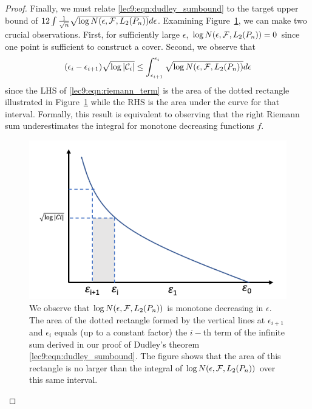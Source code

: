 \begin{proof}
    Finally, we must relate \eqref{lec9:eqn:dudley_sumbound} to the target upper bound of $12 \int \frac{1}{\sqrt{n}} \sqrt{\log N(\epsilon, \mathcal F, L_2(P_n))} d\epsilon$. Examining Figure~\ref{lec9:fig:chaining_riemann}, we can make two crucial observations. First, for sufficiently large $\epsilon$, $\log N(\epsilon, \mathcal F, L_2(P_n)) = 0$ since one point is sufficient to construct a cover. Second, we observe that 
    \begin{align}
        (\epsilon_i - \epsilon_{i + 1}) \sqrt{\log \left\lvert\mathcal C_i\right\rvert} \leq \int_{\epsilon_{i + 1}}^{\epsilon_i} \sqrt{\log N(\epsilon, \mathcal F, L_2(P_n))} d\epsilon \label{lec9:eqn:riemann_term}
    \end{align}
    since the LHS of \eqref{lec9:eqn:riemann_term} is the area of the dotted rectangle illustrated in Figure~\ref{lec9:fig:chaining_riemann} while the RHS is the area under the curve for that interval. Formally, this result is equivalent to observing that the right Riemann sum underestimates the integral for monotone decreasing functions $f$.

    \begin{figure}[ht!]
        \begin{center}
            \includegraphics[width=.7\textwidth]{figures/chaining_riemann.png}
        \end{center}
        \caption{We observe that $\log N(\epsilon, \mathcal F, L_2(P_n))$ is monotone decreasing in $\epsilon$. The area of the dotted rectangle formed by the vertical lines at $\epsilon_{i + 1}$ and $\epsilon_i$ equals (up to a constant factor) the $i-$th term of the infinite sum derived in our proof of Dudley's theorem \eqref{lec9:eqn:dudley_sumbound}. The figure shows that the area of this rectangle is no larger than the integral of $\log N(\epsilon, \mathcal F, L_2(P_n))$ over this same interval.}
        \label{lec9:fig:chaining_riemann}
    \end{figure}  


\end{proof}
